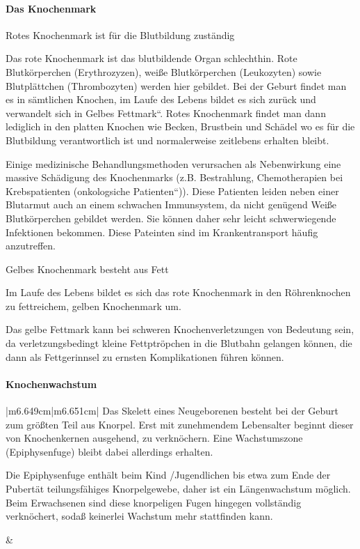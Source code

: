 \documentclass{article}
\begin{document}
\paragraph[Das Knochenmark]{Das Knochenmark}
Rotes Knochenmark ist f\"ur die Blutbildung zust\"andig

Das rote Knochenmark ist das blutbildende Organ schlechthin. Rote
Blutk\"orperchen (Erythrozyzen), wei{\ss}e Blutk\"orperchen
(Leukozyten) sowie Blutpl\"attchen (Thrombozyten) werden hier gebildet.
Bei der Geburt findet man es in s\"amtlichen Knochen, im Laufe des
Lebens bildet es sich zur\"uck und verwandelt sich in
{\quotedblbase}Gelbes Fettmark{\textquotedblleft}. Rotes Knochenmark
findet man dann lediglich in den platten Knochen wie Becken, Brustbein
und Sch\"adel wo es f\"ur die Blutbildung verantwortlich ist und
normalerweise zeitlebens erhalten bleibt. 

Einige medizinische Behandlungsmethoden verursachen als Nebenwirkung
eine massive Sch\"adigung des Knochenmarks (z.B. Bestrahlung,
Chemotherapien bei Krebspatienten ({\quotedblbase}onkologsiche
Patienten{\textquotedblleft})). Diese Patienten leiden neben einer
Blutarmut auch an einem schwachen Immunsystem, da nicht gen\"ugend
Wei{\ss}e Blutk\"orperchen gebildet werden. Sie k\"onnen daher sehr
leicht schwerwiegende Infektionen bekommen. Diese Pateinten sind im
Krankentransport h\"aufig anzutreffen. 

Gelbes Knochenmark besteht aus Fett 

Im Laufe des Lebens bildet es sich das rote Knochenmark in den
R\"ohrenknochen zu fettreichem, gelben Knochenmark um. 

Das gelbe Fettmark kann bei schweren Knochenverletzungen von Bedeutung
sein, da verletzungs\-bedingt kleine Fettptr\"opchen in die Blutbahn
gelangen k\"onnen, die dann als Fettgerinnsel  zu ernsten
Komplikationen f\"uhren k\"onnen. 

\paragraph{Knochenwachstum}
\begin{center}
\tablehead{}\begin{supertabular}{|m{6.649cm}|m{6.651cm}|}
\hline
Das Skelett eines Neugeborenen besteht bei der Geburt zum gr\"o{\ss}ten
Teil aus Knorpel. Erst mit zunehmendem Lebensalter beginnt dieser von
Knochenkernen ausgehend, zu verkn\"ochern. Eine Wachstumszone
(Epiphysenfuge) bleibt dabei allerdings erhalten.

Die Epiphysenfuge enth\"alt beim Kind /Jugendlichen bis etwa zum Ende
der Pubert\"at teilungsf\"ahiges Knorpelgewebe, daher ist ein
L\"angenwachstum m\"oglich. Beim Erwachsenen sind diese knorpeligen
Fugen hingegen vollst\"andig verkn\"ochert, soda{\ss} keinerlei
Wachstum mehr stattfinden kann.

 &
 \par

\\\hline
\end{supertabular}
\end{center}
\end{document}
